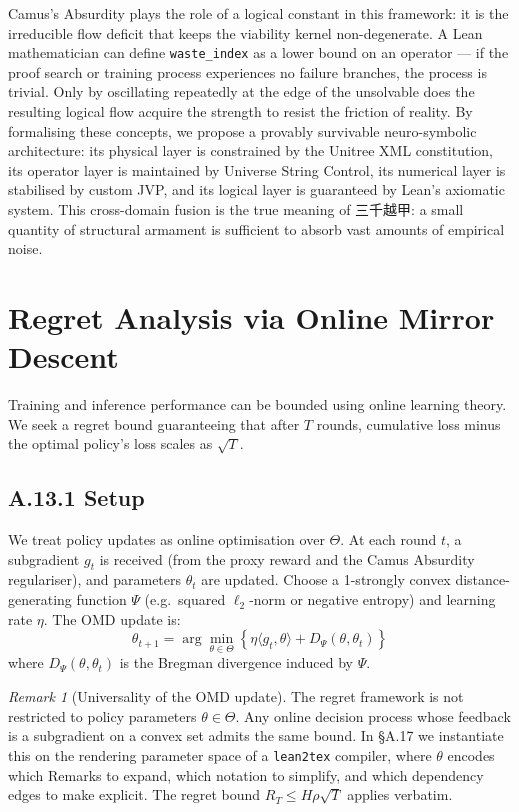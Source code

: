 \documentclass[11pt,a4paper]{article}
\theoremstyle{definition}
\theoremstyle{remark}
\newtheorem{remark}[theorem]{Remark}
\begin{document}
Camus's Absurdity plays the role of a logical constant in this framework: it is the irreducible flow deficit that keeps the viability kernel non-degenerate. A Lean mathematician can define \texttt{waste\_index} as a lower bound on an operator --- if the proof search or training process experiences no failure branches, the process is trivial. Only by oscillating repeatedly at the edge of the unsolvable does the resulting logical flow acquire the strength to resist the friction of reality. By formalising these concepts, we propose a provably survivable neuro-symbolic architecture: its physical layer is constrained by the Unitree XML constitution, its operator layer is maintained by Universe String Control, its numerical layer is stabilised by custom JVP, and its logical layer is guaranteed by Lean's axiomatic system. This cross-domain fusion is the true meaning of 三千越甲: a small quantity of structural armament is sufficient to absorb vast amounts of empirical noise.


\section{Regret Analysis via Online Mirror Descent}

Training and inference performance can be bounded using online learning theory. We seek a regret bound guaranteeing that after $T$ rounds, cumulative loss minus the optimal policy's loss scales as $\sqrt{T}$.

\subsection{A.13.1 Setup}

We treat policy updates as online optimisation over $\Theta$. At each round $t$, a subgradient $g_t$ is received (from the proxy reward and the Camus Absurdity regulariser), and parameters $\theta_t$ are updated. Choose a 1-strongly convex distance-generating function $\Psi$ (e.g.\ squared $\ell_2$-norm or negative entropy) and learning rate $\eta$. The OMD update is:
\[
  \theta_{t+1} = \arg\min_{\theta \in \Theta} \left\{ \eta \langle g_t, \theta \rangle + D_\Psi(\theta, \theta_t) \right\}
\]
where $D_\Psi(\theta, \theta_t)$ is the Bregman divergence induced by $\Psi$.

\begin{remark}[Universality of the OMD update]
The regret framework is not restricted to policy parameters $\theta \in \Theta$. Any online decision process whose feedback is a subgradient on a convex set admits the same bound. In \S A.17 we instantiate this on the rendering parameter space of a \texttt{lean2tex} compiler, where $\theta$ encodes which Remarks to expand, which notation to simplify, and which dependency edges to make explicit. The regret bound $R_T \leq H\rho\sqrt{T}$ applies verbatim.
\end{remark}
\end{document}
